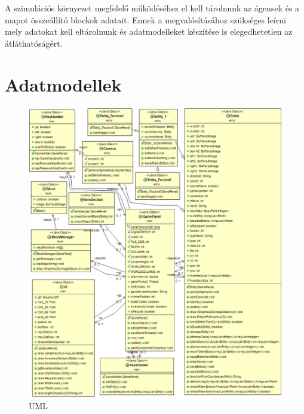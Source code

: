 
A szimulációs környezet megfelelő működéséhez el kell tárolnunk az ágensek és a mapot összeállító blockok adatait.
Ennek a megvalósításához szükséges leírni mely adatokat kell eltárolnunk és adatmodelleket készítése is elegedhetetlen az átláthatóságért.

\section{Adatmodellek}

\begin{figure}[!ht]
	\centering
	\includegraphics[scale=0.45]{images/UML.png}
	\caption{UML}
	\label{fig:UML}
\end{figure}